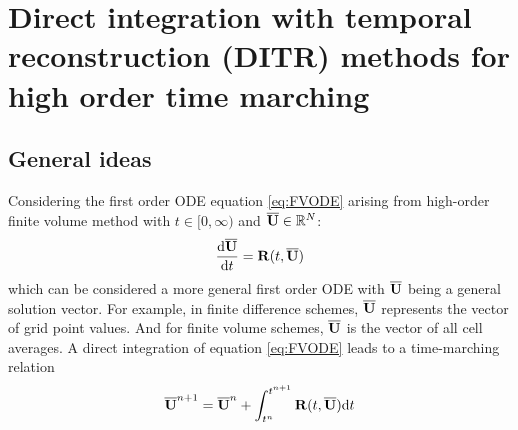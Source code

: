 

\section{Direct integration with temporal reconstruction (DITR)
  methods for high order time marching}
\label{sec:HIRK}

\subsection{General ideas}

Considering the first order ODE equation \eqref{eq:FVODE} arising
from high-order finite volume method
with
$t\in[0,\infty)$ and $\overline{\mathbf{U}}\in \mathbb{R}^N$:
\begin{equation*}
    \frac{\dd \overline{\mathbf{U}}}{\dd t} = \mathbf{R}(t, \overline{\mathbf{U}})
\end{equation*}
which can be
considered a more general first order ODE with $\overline{\mathbf{U}}$ being
a general solution vector.
For example, in finite difference schemes,
$\overline{\mathbf{U}}$ represents the vector of grid point values.
And for finite volume schemes, $\overline{\mathbf{U}}$ is the vector
of all cell averages.
A direct integration of equation \eqref{eq:FVODE}
leads to a time-marching relation
\begin{equation}
    \overline{\mathbf{U}}^{n+1} = \overline{\mathbf{U}}^{n} + \int_{t^n}^{t^{n+1}}{
    \mathbf{R}(t, \overline{\mathbf{U}}) \dd t
    }
    \label{eq:DI}
\end{equation}

